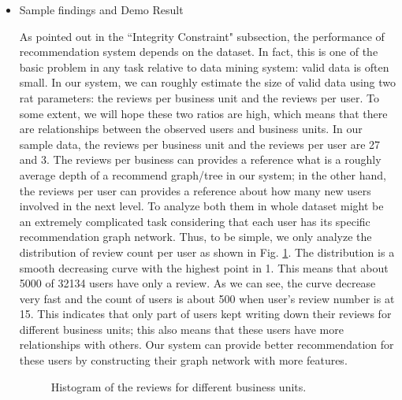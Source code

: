 \begin{itemize}
\item{Sample findings and Demo Result}

As pointed out in the ``Integrity Constraint" subsection, the performance of recommendation system depends on the dataset. In fact, this is one of the basic problem in any task relative to data mining system: valid data is often small. In our system, we can roughly estimate the size of valid data using two rat parameters: the reviews per business unit and the reviews per user. To some extent, we will hope these two ratios are high, which means that there are relationships between the observed users and business units. In our sample data, the reviews per business unit and the reviews per user are 27 and 3. The reviews per business can provides a reference what is a roughly average depth of a recommend graph/tree in our system; in the other hand, the reviews per user can provides a reference about how many new users involved in the next level. To analyze both them in whole dataset might be an extremely complicated task considering that each user has its specific recommendation graph network. Thus, to be simple, we only analyze the distribution of review count per user as shown in Fig. \ref{fig:review_count_per_user}. The distribution is a smooth decreasing curve with the highest point in 1. This means that about 5000 of 32134 users have only a review. As we can see, the curve decrease very fast and the count of users is about 500 when user's review number is at 15. This indicates that only part of users kept writing down their reviews for different business units; this also means that these users have more relationships with others. Our system can provide better recommendation for these users by constructing their graph network with more features. 

\begin{figure}[h] 
	\begin{center}
		\advance\rightskip-1cm
		{}
		\caption{Histogram of the reviews for different business units.}\label{fig:review_count_per_user}
	\end{center}
\end{figure}


\end{itemize}
